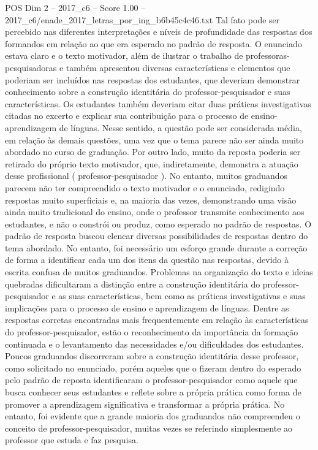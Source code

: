 \begin{textsample}{POS Dim 2 – 2017\_c6 – Score 1.00 – 2017\_c6/enade\_2017\_letras\_por\_ing\_b6b45c4c46.txt}
Tal fato pode ser percebido nas diferentes interpretações e níveis de profundidade das respostas dos formandos em relação ao que era esperado no padrão de resposta.
O enunciado estava claro e o texto motivador, além de ilustrar o trabalho de professoras-pesquisadoras e também apresentou diversas características e elementos que poderiam ser incluídos nas respostas dos estudantes, que deveriam demonstrar conhecimento sobre a construção identitária do professor-pesquisador e suas características.
Os estudantes também deveriam citar duas práticas investigativas citadas no excerto e explicar sua contribuição para o processo de ensino-aprendizagem de línguas.
Nesse sentido, a questão pode ser considerada média, em relação às demais questões, uma vez que o tema parece não ser ainda muito abordado no curso de graduação.
Por outro lado, muito da reposta poderia ser retirado do próprio texto motivador, que, indiretamente, demonstra a atuação desse profissional ( professor-pesquisador ).
No entanto, muitos graduandos parecem não ter compreendido o texto motivador e o enunciado, redigindo respostas muito superficiais e, na maioria das vezes, demonstrando uma visão ainda muito tradicional do ensino, onde o professor transmite conhecimento aos estudantes, e não o constrói ou produz, como esperado no padrão de respostas.
O padrão de resposta buscou elencar diversas possibilidades de respostas dentro do tema abordado.
No entanto, foi necessário um esforço grande durante a correção de forma a identificar cada um dos itens da questão nas respostas, devido à escrita confusa de muitos graduandos.
Problemas na organização do texto e ideias quebradas dificultaram a distinção entre a construção identitária do professor-pesquisador e as suas características, bem como as práticas investigativas e suas implicações para o processo de ensino e aprendizagem de línguas.
Dentre as respostas corretas encontradas mais frequentemente em relação às características do professor-pesquisador, estão o reconhecimento da importância da formação continuada e o levantamento das necessidades e/ou dificuldades dos estudantes.
Poucos graduandos discorreram sobre a construção identitária desse professor, como solicitado no enunciado, porém aqueles que o fizeram dentro do esperado pelo padrão de reposta identificaram o professor-pesquisador como aquele que busca conhecer seus estudantes e reflete sobre a própria prática como forma de promover a aprendizagem significativa e transformar a própria prática.
No entanto, foi evidente que a grande maioria dos graduandos não compreendeu o conceito de professor-pesquisador, muitas vezes se referindo simplesmente ao professor que estuda e faz pesquisa.

\end{textsample}
